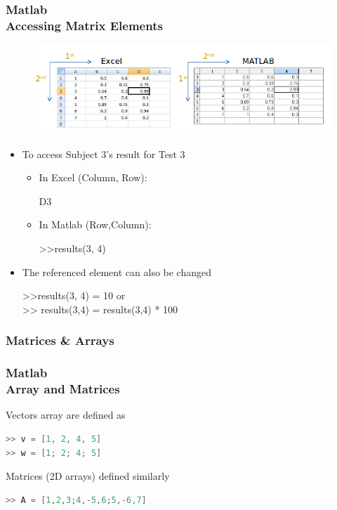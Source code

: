 \documentclass[hyperref={pdfpagelabels=true}]{beamer}
\begin{document}
\begin{frame}
\frametitle{Matlab \\ {\large Accessing Matrix Elements}}
\begin{figure}[!tbp]
\centering
\includegraphics[scale = 0.46]{figs/Selection_012a.png}
\end{figure}
\begin{itemize}
\item To access Subject 3's result for Test 3
  \begin{itemize}
  \item In Excel (Column, Row): \\ \begin{center} D3 \end{center}
  \item In Matlab (Row,Column): \\ \begin{center} >>\textcolor{mygreen}{results(3, 4)} \end{center}
  \end{itemize}
\item The referenced element can also be changed \\ \begin{center} >>\textcolor{mygreen}{results(3, 4) = 10} or \\
>> \textcolor{mygreen}{results(3,4) = results(3,4) * 100} \end{center}
\end{itemize}
\end{frame}

\subsubsection{Matrices \& Arrays} 

\begin{frame}[fragile]
\frametitle{Matlab \\ {\small Array and Matrices}}
Vectors array are defined as
\begin{tcolorbox}[title= ,width=9.85 cm]
\begin{lstlisting}[language=C++]
>> v = [1, 2, 4, 5] 
>> w = [1; 2; 4; 5]
\end{lstlisting}
\end{tcolorbox}
Matrices (2D arrays) defined similarly
\begin{tcolorbox}[title= ,width=9.85 cm]
\begin{lstlisting}[language=C++,basicstyle=\ttfamily,keywordstyle=\color{red}]
>> A = [1,2,3;4,-5,6;5,-6,7]
\end{lstlisting}
\end{tcolorbox}
\end{frame}
\end{document}
